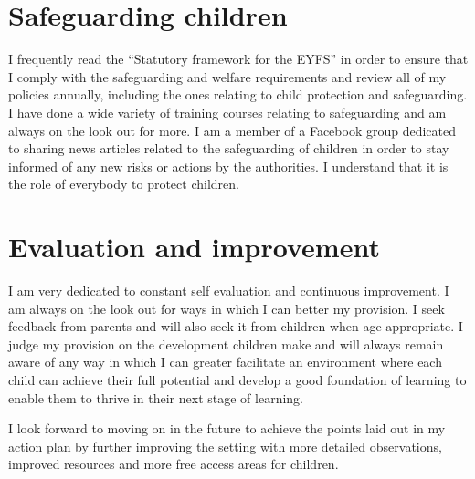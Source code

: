 \documentclass[10pt,a4paper]{report}
\makeatletter
\newcommand{\DESCRIPTION@original@item}{}
\let\DESCRIPTION@original@item\item
\newcommand*{\DESCRIPTION@envir}{DESCRIPTION}
\newlength{\DESCRIPTION@totalleftmargin}
\newlength{\DESCRIPTION@linewidth}
\newcommand{\DESCRIPTION@makelabel}[1]{\llap{#1}}%
\newcommand{\DESCRIPTION@item}[1][]{%
  \setlength{\@totalleftmargin}%
       {\DESCRIPTION@totalleftmargin+\widthof{\textbf{#1 }}-\leftmargin}%
  \setlength{\linewidth}
       {\DESCRIPTION@linewidth-\widthof{\textbf{#1 }}+\leftmargin}%
  \par\parshape \@ne \@totalleftmargin \linewidth
  \DESCRIPTION@original@item[\textbf{#1}]%
}
\newenvironment{DESCRIPTION}
  {\list{}{\setlength{\labelwidth}{0cm}%
           \let\makelabel\DESCRIPTION@makelabel}%
   \setlength{\DESCRIPTION@totalleftmargin}{\@totalleftmargin}%
   \setlength{\DESCRIPTION@linewidth}{\linewidth}%
   \renewcommand{\item}{\ifx\@currenvir\DESCRIPTION@envir
                           \expandafter\DESCRIPTION@item
                        \else
                           \expandafter\DESCRIPTION@original@item
                        \fi}}
  {\endlist}
\makeatother
\begin{document}
\begin{DESCRIPTION}
\begin{DESCRIPTION}
\section{Safeguarding children}

I frequently read the “Statutory framework for the EYFS” in order to ensure that I comply with the safeguarding and welfare requirements and review all of my policies annually, including the ones relating to child protection and safeguarding. I have done a wide variety of training courses relating to safeguarding and am always on the look out for more. I am a member of a Facebook group dedicated to sharing news articles related to the safeguarding of children in order to stay informed of any new risks or actions by the authorities. I understand that it is the role of everybody to protect children.

\section{Evaluation and improvement}

I am very dedicated to constant self evaluation and continuous improvement. I am always on the look out for ways in which I can better my provision. I seek feedback from parents and will also seek it from children when age appropriate. I judge my provision on the development children make and will always remain aware of any way in which I can greater facilitate an environment where each child can achieve their full potential and develop a good foundation of learning to enable them to thrive in their next stage of learning. 

I look forward to moving on in the future to achieve the points laid out in my action plan by further improving the setting with more detailed observations, improved resources and more free access areas for children.
\end{document}
